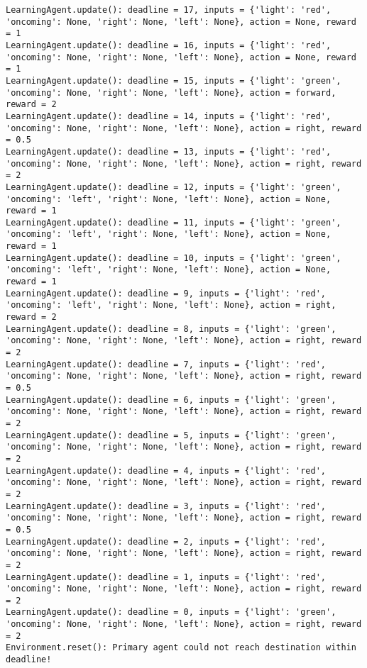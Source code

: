 \documentclass{article}
\begin{document}
\begin{verbatim}
LearningAgent.update(): deadline = 17, inputs = {'light': 'red', 'oncoming': None, 'right': None, 'left': None}, action = None, reward = 1
LearningAgent.update(): deadline = 16, inputs = {'light': 'red', 'oncoming': None, 'right': None, 'left': None}, action = None, reward = 1
LearningAgent.update(): deadline = 15, inputs = {'light': 'green', 'oncoming': None, 'right': None, 'left': None}, action = forward, reward = 2
LearningAgent.update(): deadline = 14, inputs = {'light': 'red', 'oncoming': None, 'right': None, 'left': None}, action = right, reward = 0.5
LearningAgent.update(): deadline = 13, inputs = {'light': 'red', 'oncoming': None, 'right': None, 'left': None}, action = right, reward = 2
LearningAgent.update(): deadline = 12, inputs = {'light': 'green', 'oncoming': 'left', 'right': None, 'left': None}, action = None, reward = 1
LearningAgent.update(): deadline = 11, inputs = {'light': 'green', 'oncoming': 'left', 'right': None, 'left': None}, action = None, reward = 1
LearningAgent.update(): deadline = 10, inputs = {'light': 'green', 'oncoming': 'left', 'right': None, 'left': None}, action = None, reward = 1
LearningAgent.update(): deadline = 9, inputs = {'light': 'red', 'oncoming': 'left', 'right': None, 'left': None}, action = right, reward = 2
LearningAgent.update(): deadline = 8, inputs = {'light': 'green', 'oncoming': None, 'right': None, 'left': None}, action = right, reward = 2
LearningAgent.update(): deadline = 7, inputs = {'light': 'red', 'oncoming': None, 'right': None, 'left': None}, action = right, reward = 0.5
LearningAgent.update(): deadline = 6, inputs = {'light': 'green', 'oncoming': None, 'right': None, 'left': None}, action = right, reward = 2
LearningAgent.update(): deadline = 5, inputs = {'light': 'green', 'oncoming': None, 'right': None, 'left': None}, action = right, reward = 2
LearningAgent.update(): deadline = 4, inputs = {'light': 'red', 'oncoming': None, 'right': None, 'left': None}, action = right, reward = 2
LearningAgent.update(): deadline = 3, inputs = {'light': 'red', 'oncoming': None, 'right': None, 'left': None}, action = right, reward = 0.5
LearningAgent.update(): deadline = 2, inputs = {'light': 'red', 'oncoming': None, 'right': None, 'left': None}, action = right, reward = 2
LearningAgent.update(): deadline = 1, inputs = {'light': 'red', 'oncoming': None, 'right': None, 'left': None}, action = right, reward = 2
LearningAgent.update(): deadline = 0, inputs = {'light': 'green', 'oncoming': None, 'right': None, 'left': None}, action = right, reward = 2
Environment.reset(): Primary agent could not reach destination within deadline!
\end{verbatim}
\end{document}
